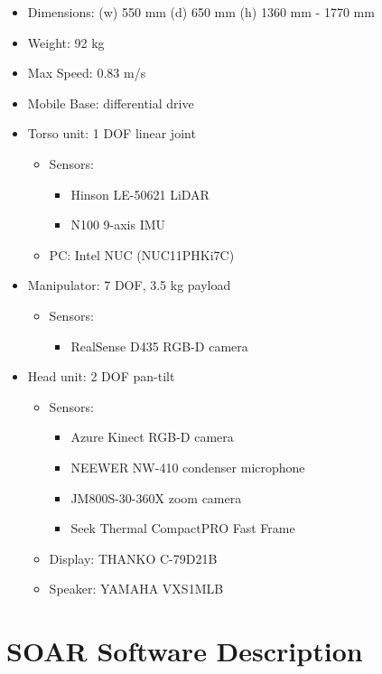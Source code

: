 \begin{itemize}
	\item Dimensions: (w) 550 mm (d) 650 mm (h) 1360 mm - 1770 mm
	\item Weight: 92 kg
	\item Max Speed: 0.83 m/s
	\item Mobile Base: differential drive
	\item Torso unit: 1 DOF linear joint
	      \begin{itemize}
		      \item Sensors:
		            \begin{itemize}
			            \item Hinson LE-50621 LiDAR
			            \item N100 9-axis IMU
		            \end{itemize}
		      \item PC: Intel NUC (NUC11PHKi7C)
	      \end{itemize}
	\item Manipulator: 7 DOF, 3.5 kg payload
	      \begin{itemize}
		      \item Sensors:
		            \begin{itemize}
			            \item RealSense D435 RGB-D camera
		            \end{itemize}
	      \end{itemize}
	\item Head unit: 2 DOF pan-tilt
	      \begin{itemize}
		      \item Sensors:
		            \begin{itemize}
			            \item Azure Kinect RGB-D camera
			            \item NEEWER NW-410 condenser microphone
			            \item JM800S-30-360X zoom camera
			            \item Seek Thermal CompactPRO Fast Frame
		            \end{itemize}
		      \item Display: THANKO C-79D21B
		      \item Speaker: YAMAHA VXS1MLB
	      \end{itemize}
\end{itemize}

\section*{SOAR Software Description}

